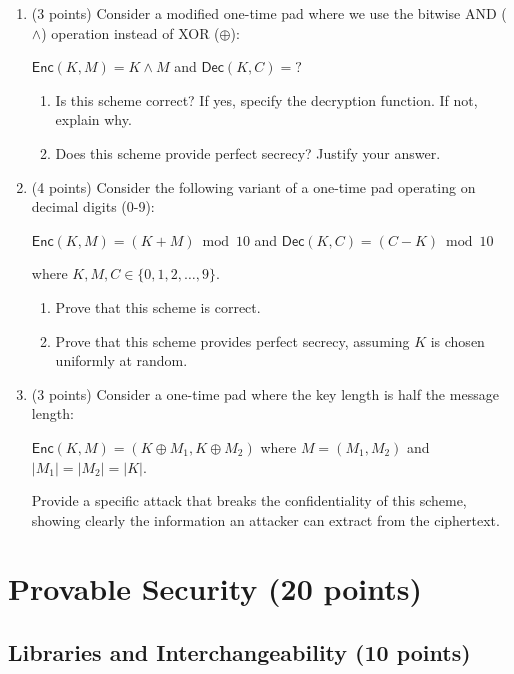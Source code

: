 \documentclass[10pt,a4paper,american]{article}
\begin{document}
\begin{enumerate}
	\item (3 points) Consider a modified one-time pad where we use the bitwise AND ($\land$) operation instead of XOR ($\oplus$):

	      $\textsf{Enc}(K, M) = K \land M$ and $\textsf{Dec}(K, C) = ?$

	      \begin{enumerate}
		      \item Is this scheme correct? If yes, specify the decryption function. If not, explain why.
		      \item Does this scheme provide perfect secrecy? Justify your answer.
	      \end{enumerate}

	\item (4 points) Consider the following variant of a one-time pad operating on decimal digits (0-9):

	      $\textsf{Enc}(K, M) = (K + M) \bmod 10$ and $\textsf{Dec}(K, C) = (C - K) \bmod 10$

	      where $K, M, C \in \{0, 1, 2, \ldots, 9\}$.

	      \begin{enumerate}
		      \item Prove that this scheme is correct.
		      \item Prove that this scheme provides perfect secrecy, assuming $K$ is chosen uniformly at random.
	      \end{enumerate}

	\item (3 points) Consider a one-time pad where the key length is half the message length:

	      $\textsf{Enc}(K, M) = (K \oplus M_1, K \oplus M_2)$ where $M = (M_1, M_2)$ and $|M_1| = |M_2| = |K|$.

	      Provide a specific attack that breaks the confidentiality of this scheme, showing clearly the information an attacker can extract from the ciphertext.
\end{enumerate}

\section{Provable Security (20 points)}

\subsection{Libraries and Interchangeability (10 points)}
\end{document}
